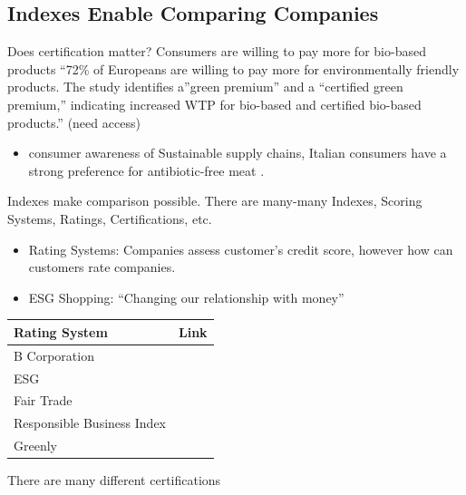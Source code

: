 \documentclass[
  letterpaper,
  DIV=11,
  numbers=noendperiod]{scrartcl}
\providecommand{\tightlist}{%
  \setlength{\itemsep}{0pt}\setlength{\parskip}{0pt}}\usepackage{longtable,booktabs,array}
\begin{document}
\subsection{Indexes Enable Comparing
Companies}\label{indexes-enable-comparing-companies}

Does certification matter? Consumers are willing to pay more for
bio-based products ``72\% of Europeans are willing to pay more for
environmentally friendly products. The study identifies a''green
premium'' and a ``certified green premium,'' indicating increased WTP
for bio-based and certified bio-based products.''
\citet{moroneConsumerWillingnessPay2021} (need access)

\begin{itemize}
\tightlist
\item
  consumer awareness of Sustainable supply chains, Italian consumers
  have a strong preference for antibiotic-free meat
  \citep{mazzocchiConsumerAwarenessSustainable2022}.
\end{itemize}

Indexes make comparison possible. There are many-many Indexes, Scoring
Systems, Ratings, Certifications, etc.

\begin{itemize}
\tightlist
\item
  Rating Systems: Companies assess customer's credit score, however how
  can customers rate companies.
\item
  ESG Shopping: ``Changing our relationship with money''
\end{itemize}

\begin{longtable}[]{@{}ll@{}}
\toprule\noalign{}
Rating System & Link \\
\midrule\noalign{}
\endhead
\bottomrule\noalign{}
\endlastfoot
B Corporation & \\
ESG & \\
Fair Trade & \\
Responsible Business Index & \\
Greenly & \\
\end{longtable}

There are many different certifications
\end{document}
